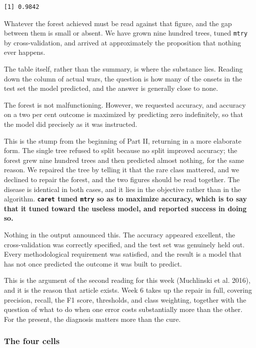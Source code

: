 \documentclass[
  a4paper,
]{scrbook}
\newcounter{none} %
\begin{document}
\begin{verbatim}
[1] 0.9842
\end{verbatim}

Whatever the forest achieved must be read against that figure, and the
gap between them is small or absent. We have grown nine hundred trees,
tuned \texttt{mtry} by cross-validation, and arrived at approximately
the proposition that nothing ever happens.

The table itself, rather than the summary, is where the substance lies.
Reading down the column of actual wars, the question is how many of the
onsets in the test set the model predicted, and the answer is generally
close to none.

The forest is not malfunctioning. However, we requested accuracy, and
accuracy on a two per cent outcome is maximized by predicting zero
indefinitely, so that the model did precisely as it was instructed.

This is the stump from the beginning of Part II, returning in a more
elaborate form. The single tree refused to split because no split
improved accuracy; the forest grew nine hundred trees and then predicted
almost nothing, for the same reason. We repaired the tree by telling it
that the rare class mattered, and we declined to repair the forest, and
the two figures should be read together. The disease is identical in
both cases, and it lies in the objective rather than in the algorithm.
\textbf{\texttt{caret} tuned \texttt{mtry} so as to maximize accuracy,
which is to say that it tuned toward the useless model, and reported
success in doing so.}

Nothing in the output announced this. The accuracy appeared excellent,
the cross-validation was correctly specified, and the test set was
genuinely held out. Every methodological requirement was satisfied, and
the result is a model that has not once predicted the outcome it was
built to predict.

This is the argument of the second reading for this week (Muchlinski et
al. 2016), and it is the reason that article exists. Week 6 takes up the
repair in full, covering precision, recall, the F1 score, thresholds,
and class weighting, together with the question of what to do when one
error costs substantially more than the other. For the present, the
diagnosis matters more than the cure.

\subsubsection{The four cells}\label{the-four-cells}
\end{document}
